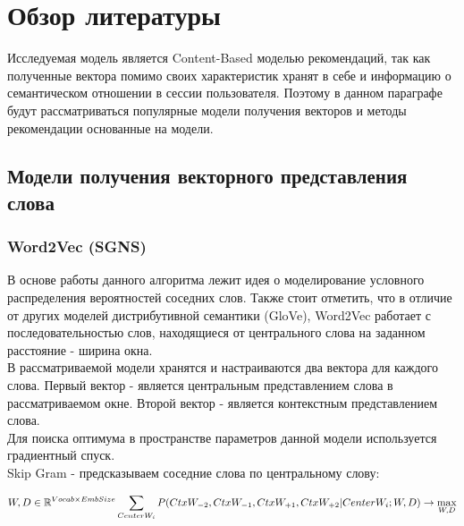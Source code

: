 \chapter{Обзор литературы} \label{ch2}
	

Исследуемая модель является Content-Based моделью рекомендаций, так как полученные вектора помимо своих характеристик хранят в себе и информацию о семантическом отношении в сессии пользователя.
Поэтому в данном параграфе будут рассматриваться популярные модели получения векторов и методы рекомендации основанные на модели.

\section{Модели получения векторного представления слова}
\subsection{Word2Vec (SGNS)} 

В основе работы данного алгоритма лежит идея о моделирование условного распределения вероятностей соседних слов. Также стоит отметить, что в отличие от других моделей дистрибутивной семантики (GloVe), Word2Vec работает с последовательностью слов, находящиеся от центрального слова на заданном расстояние - ширина окна.\\
В рассматриваемой модели хранятся и настраиваются два вектора для каждого слова. Первый вектор - является центральным представлением слова в рассматриваемом окне. Второй вектор - является контекстным представлением слова. \\
Для поиска оптимума в пространстве параметров данной модели используется градиентный спуск. \\

Skip Gram - предсказываем соседние слова по центральному слову\cite{word2vec}:

\begin{equation}
	W, D \in \mathbb{R}^{Vocab \times EmbSize} \\
	\sum_{CenterW_i} P(CtxW_{-2}, CtxW_{-1}, CtxW_{+1}, CtxW_{+2} | CenterW_i; W, D) \rightarrow \max_{W,D}
\end{equation}

